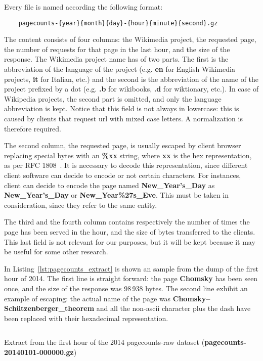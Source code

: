 Every file is named according the following format:
\begin{verbatim}
    pagecounts-{year}{month}{day}-{hour}{minute}{second}.gz
\end{verbatim}
The content consists of four columns: the Wikimedia project, the requested page, the number of requests for that page in the last hour, and the size of the response.
The Wikimedia project name has of two parts.
The first is the abbreviation of the language of the project (e.g. \textbf{en} for English Wikimedia projects, \textbf{it} for Italian, etc.) and the second is the abbreviation of the name of the project prefixed by a dot (e.g. \textbf{.b} for wikibooks, \textbf{.d} for wiktionary, etc.).
In case of Wikipedia projects, the second part is omitted, and only the language abbreviation is kept.
Notice that this field is not always in lowercase: this is caused by clients that request url with mixed case letters.
A normalization is therefore required.

The second column, the requested page, is usually escaped by client browser replacing special bytes with an \textbf{\%xx} string, where \textbf{xx} is the hex representation, as per RFC 1808~\cite{rfc1808}.
It is necessary to decode this representation, since different client software can decide to encode or not certain characters.
For instances, client can decide to encode the page named \textbf{New\_Year's\_Day} as \textbf{New\_Year's\_Day} or \textbf{New\_Year\%27s\_Eve}.
This must be taken in consideration, since they refer to the same entity.

The third and the fourth column contains respectively the number of times the page has been served in the hour, and the size of bytes transferred to the clients.
This last field is not relevant for our purposes, but it will be kept because it may be useful for some other research.

In Listing~\ref{lst:pagecounts_extract} is shown an sample from the dump of the first hour of 2014.
The first line is straight forward: the page \textbf{Chomsky} has been seen once, and the size of the response was 98\,938 bytes.
The second line exhibit an example of escaping: the actual name of the page was \textbf{Chomsky–Schützenberger\_theorem} and all the non-ascii character plus the dash have been replaced with their hexadecimal representation.

\begin{listing}[h]
    \inputminted[breaklines=true]{xml}{assets/pagecounts_extract_first_hour.txt}
    \caption{Extract from the first hour of the 2014 pagecounts-raw dataset (\textbf{pagecounts-20140101-000000.gz})}
    \label{lst:pagecounts_extract}
\end{listing}

